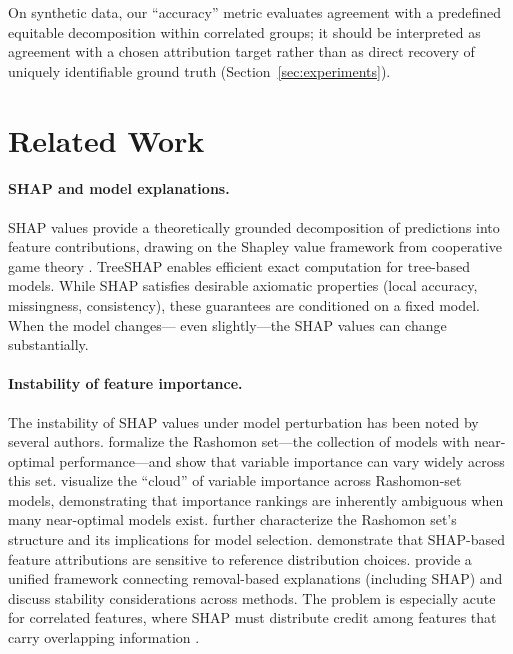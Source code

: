 \documentclass[11pt]{article}
\begin{document}
\noindent On synthetic data, our ``accuracy'' metric evaluates agreement with a
predefined equitable decomposition within correlated groups; it should be
interpreted as agreement with a chosen attribution target rather than as
direct recovery of uniquely identifiable ground truth
(Section~\ref{sec:experiments}).


\section{Related Work}
\label{sec:related}

\paragraph{SHAP and model explanations.}
SHAP values \citep{lundberg2017unified} provide a theoretically grounded
decomposition of predictions into feature contributions, drawing on the
Shapley value framework from cooperative game theory
\citep{shapley1953value}. TreeSHAP \citep{lundberg2020local} enables
efficient exact computation for tree-based models. While SHAP satisfies
desirable axiomatic properties (local accuracy, missingness, consistency),
these guarantees are conditioned on a fixed model. When the model changes---
even slightly---the SHAP values can change substantially.

\paragraph{Instability of feature importance.}
The instability of SHAP values under model perturbation has been noted by
several authors. \citet{fisher2019all} formalize the Rashomon set---the
collection of models with near-optimal performance---and show that
variable importance can vary widely across this set.
\citet{dong2020exploring} visualize the ``cloud'' of variable importance
across Rashomon-set models, demonstrating that importance rankings are
inherently ambiguous when many near-optimal models exist.
\citet{semenova2022existence} further characterize the Rashomon set's
structure and its implications for model selection.
\citet{marx2023but} demonstrate that SHAP-based feature attributions
are sensitive to reference distribution choices.
\citet{covert2021explaining} provide a unified framework connecting
removal-based explanations (including SHAP) and discuss stability
considerations across methods.
The problem is especially acute for correlated features, where SHAP must
distribute credit among features that carry overlapping information
\citep{kumar2020problems, chen2020true}.
\end{document}

